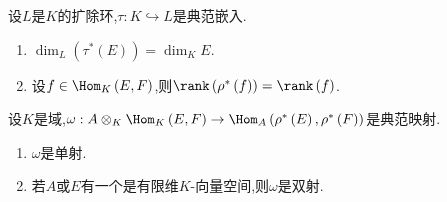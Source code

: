\begin{proposition}{}{}
	设$L$是$K$的扩除环,$\tau:K\hookrightarrow L$是典范嵌入.
	\begin{enumerate}
		\item $\dim_{L}\left(\tau^{\ast}\left(E\right)\right)=\dim_{K}E$.
		\item 设$f\in\Hom_{K}\left(E,F\right)$,则$\rank\left(\rho^{\ast}\left(f\right)\right)=\rank\left(f\right)$.
	\end{enumerate}
\end{proposition}

\begin{proposition}{}{}
	设$K$是域,$\omega:A\otimes_{K}\Hom_{K}\left(E,F\right)\to\Hom_{A}\left(\rho^{\ast}\left(E\right),\rho^{\ast}\left(F\right)\right)$是典范映射.
	\begin{enumerate}
		\item $\omega$是单射.
		\item 若$A$或$E$有一个是有限维$K$-向量空间,则$\omega$是双射.
	\end{enumerate}
\end{proposition}
















